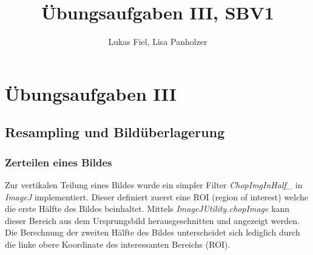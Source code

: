 \documentclass[12pt,german]{article}
\begin{document}
\title{Übungsaufgaben III, SBV1 }
\author{Lukas Fiel, Lisa Panholzer}
\maketitle


\newpage
\section{Übungsaufgaben III}
\subsection{Resampling und Bildüberlagerung}
\subsubsection{Zerteilen eines Bildes}
\label{chopImg}
Zur vertikalen Teilung eines Bildes wurde ein simpler Filter \textit{ChopImgInHalf\_} in \textit{ImageJ} implementiert. Dieser definiert zuerst eine ROI (region of interest) welche die erste Hälfte des Bildes beinhaltet. Mittels \textit{ImageJUtility.chopImage} kann dieser Bereich aus dem Ursprungsbild herausgeschnitten und angezeigt werden. Die Berechnung der zweiten Hälfte des Bildes unterscheidet sich lediglich durch die linke obere Koordinate des interessanten Bereichs (ROI). 
\end{document}
